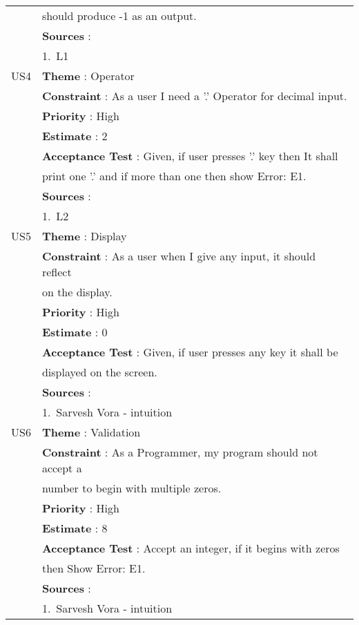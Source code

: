 \documentclass{article}
\begin{document}
\begin{longtable}{|| c || l ||}
         & should produce -1 as an output. \\
         & \textbf{Sources} : \\
         & 1.~L1 \\
         \hline
         US4 & \textbf{Theme} : Operator \\
         & \textbf{Constraint} : As a user I need a '.' Operator for decimal input. \\ 
         & \textbf{Priority} : High \\
         & \textbf{Estimate} : 2 \\
         & \textbf{Acceptance Test} : Given, if user presses '.' key then It shall \\ 
         & print one '.' and if more than one then show Error: E1. \\
         & \textbf{Sources} : \\
         & 1.~L2 \\
         \hline
         \newpage
         \hline
         US5 & \textbf{Theme} : Display \\
         & \textbf{Constraint} : As a user when I give any input, it should reflect \\ 
         & on the display.\\ 
         & \textbf{Priority} : High \\
         & \textbf{Estimate} : 0 \\
         & \textbf{Acceptance Test} : Given, if user presses any key it shall be \\ 
         & displayed on the screen.\\
         & \textbf{Sources} : \\
         & 1.~Sarvesh Vora - intuition \\
         \hline
         US6 & \textbf{Theme} : Validation \\
         & \textbf{Constraint} : As a Programmer, my program should not accept a \\
         & number to begin with multiple zeros. \\
         & \textbf{Priority} : High \\
         & \textbf{Estimate} : 8 \\
         & \textbf{Acceptance Test} : Accept an integer, if it begins with zeros \\
         & then Show Error: E1.\\
         & \textbf{Sources} : \\
         & 1.~Sarvesh Vora - intuition \\

\end{longtable}
\end{document}

